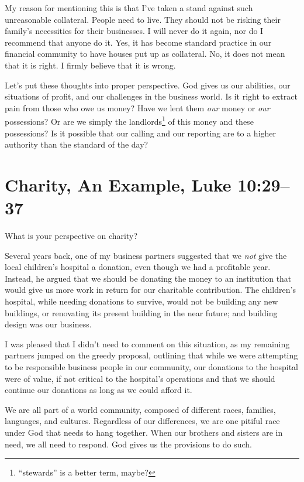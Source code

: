 \documentclass[12pt]{memoir}
\begin{document}
My reason for mentioning this is that I've taken a stand against such unreasonable collateral. People need to live. They should not be risking their family's necessities for their businesses. I will never do it again, nor do I recommend that anyone do it. Yes, it has become standard practice in our financial community to have houses put up as collateral. No, it does not mean that it is right. I firmly believe that it is wrong.

Let's put these thoughts into proper perspective. God gives us our abilities, our situations of profit, and our challenges in the business world. Is it right to extract pain from those who owe us money? Have we lent them \emph{our} money or \emph{our} possessions? Or are we simply the landlords\footnote{``stewards'' is a better term, maybe?} of this money and these possessions? Is it possible that our calling and our reporting are to a higher authority than the standard of the day?

\section[An Example of Charity]{Charity, An Example, Luke 10:29--37}

What is your perspective on charity?

Several years back, one of my business partners suggested that we \emph{not} give the local children's hospital a donation, even though we had a profitable year. Instead, he argued that we should be donating the money to an institution that would give us more work in return for our charitable contribution. The children's hospital, while needing donations to survive, would not be building any new buildings, or renovating its present building in the near future; and building design was our business.

I was pleased that I didn't need to comment on this situation, as my remaining partners jumped on the greedy proposal, outlining that while we were attempting to be responsible business people in our community, our donations to the hospital were of value, if not critical to the hospital's operations and that we should continue our donations as long as we could afford it. 

We are all part of a world community, composed of different races, families, languages, and cultures. Regardless of our differences, we are one pitiful race under God that needs to hang together. When our brothers and sisters are in need, we all need to respond. God gives us the provisions to do such.
\end{document}
